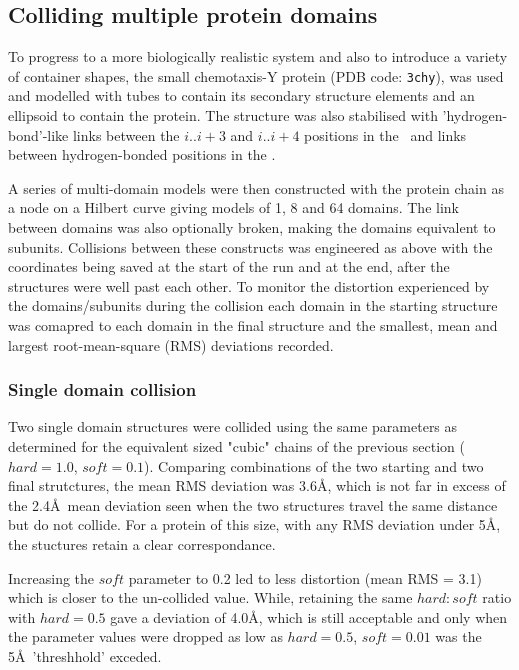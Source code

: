 \subsection{Colliding multiple protein domains}

To progress to a more biologically realistic system and also to introduce a variety
of container shapes, the small chemotaxis-Y protein (PDB code: {\tt 3chy}), was used
and modelled with tubes to contain its secondary structure elements and an ellipsoid
to contain the protein.    The structure was also stabilised with 'hydrogen-bond'-like
links between the $i..i+3$ and $i..i+4$ positions in the \AHs\ and links between
hydrogen-bonded positions in the \BS.

A series of multi-domain models were then constructed with the protein chain as a
node on a Hilbert curve giving models of 1, 8 and 64 domains.   The link between 
domains was also optionally broken, making the domains equivalent to subunits.
Collisions between these constructs was engineered as above with the coordinates
being saved at the start of the run and at the end, after the structures were well
past each other.    To monitor the distortion experienced by the domains/subunits
during the collision each domain in the starting structure was comapred to each
domain in the final structure and the smallest, mean and largest root-mean-square
(RMS) deviations recorded. 

\subsubsection{Single domain collision}

Two single domain structures were collided using the same parameters as determined
for the equivalent sized "cubic" chains of the previous section ($hard = 1.0$, $soft = 0.1$).
Comparing combinations of the two starting and two final strutctures, the mean RMS
deviation was 3.6\AA , which is not far in excess of the 2.4\AA\ mean deviation seen
when the two structures travel the same distance but do not collide.   For a protein
of this size, with any RMS deviation under 5\AA, the stuctures retain a clear correspondance. 

Increasing the $soft$ parameter to 0.2 led to less distortion (mean RMS = 3.1) which
is closer to the un-collided value.   While, retaining the same $hard:soft$ ratio
with $hard = 0.5$ gave a deviation of 4.0\AA, which is still acceptable and only
when the parameter values were dropped as low as $hard = 0.5$, $soft = 0.01$ was the
5\AA\ 'threshhold' exceded.  

